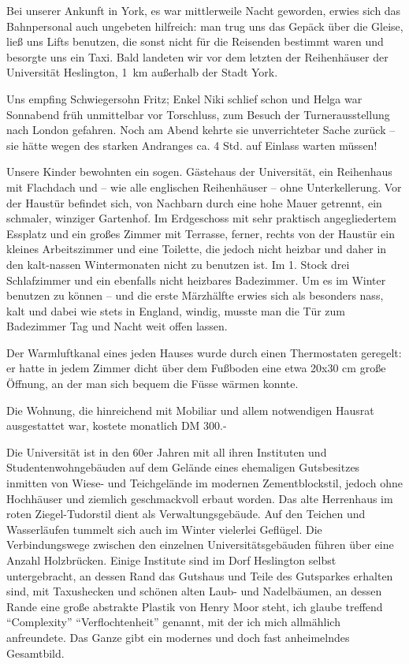 \documentclass[a5paper,pagesize,10pt,twoside=true]{scrbook}
\begin{document}
Bei unserer Ankunft in York, es war mittlerweile Nacht geworden, erwies sich das Bahnpersonal auch ungebeten hilfreich: man trug uns das Gepäck über die Gleise, ließ uns Lifts benutzen, die sonst nicht für die Reisenden bestimmt waren und besorgte uns ein Taxi. Bald landeten wir vor dem letzten der Reihenhäuser der Universität Heslington, 1~km außerhalb der Stadt York.

Uns empfing Schwiegersohn Fritz; Enkel Niki schlief schon und Helga war Sonnabend früh unmittelbar vor Torschluss, zum Besuch der Turnerausstellung nach London gefahren. Noch am Abend kehrte sie unverrichteter Sache zurück -- sie hätte wegen des starken Andranges ca. 4 Std. auf Einlass warten müssen!

Unsere Kinder bewohnten ein sogen. Gästehaus der Universität, ein Reihenhaus mit Flachdach und -- wie alle englischen Reihenhäuser -- ohne Unterkellerung. Vor der Haustür befindet sich, von Nachbarn durch eine hohe Mauer getrennt, ein schmaler, winziger Gartenhof. Im Erdgeschoss mit sehr praktisch angegliedertem Essplatz und ein großes Zimmer mit Terrasse, ferner, rechts von der Haustür ein kleines Arbeitszimmer und eine Toilette, die jedoch nicht heizbar und daher in den kalt-nassen Wintermonaten nicht zu benutzen ist. Im 1. Stock drei Schlafzimmer und ein ebenfalls nicht heizbares Badezimmer. Um es im Winter benutzen zu können -- und die erste Märzhälfte erwies sich als besonders nass, kalt und dabei wie stets in England, windig, musste man die Tür zum Badezimmer Tag und Nacht weit offen lassen.

Der Warmluftkanal eines jeden Hauses wurde durch einen Thermostaten geregelt: er hatte in jedem Zimmer dicht über dem Fußboden eine etwa 20x30 cm große Öffnung, an der man sich bequem die Füsse wärmen konnte.

Die Wohnung, die hinreichend mit Mobiliar und allem notwendigen Hausrat ausgestattet war, kostete monatlich DM 300.-

Die Universität ist in den 60er Jahren mit all ihren Instituten und Studentenwohngebäuden auf dem Gelände eines ehemaligen Gutsbesitzes inmitten von Wiese- und Teichgelände im modernen Zementblockstil, jedoch ohne Hochhäuser und ziemlich geschmackvoll erbaut worden. Das alte Herrenhaus im roten Ziegel-Tudorstil dient als Verwaltungsgebäude. Auf den Teichen und Wasserläufen tummelt sich auch im Winter vielerlei Geflügel. Die Verbindungswege zwischen den einzelnen Universitätsgebäuden führen über eine Anzahl Holzbrücken. Einige Institute sind im Dorf Heslington selbst untergebracht, an dessen Rand das Gutshaus und Teile des Gutsparkes erhalten sind, mit Taxushecken und schönen alten Laub- und Nadelbäumen, an dessen Rande eine große abstrakte Plastik von Henry Moor steht, ich glaube treffend \enquote{Complexity} \enquote{Verflochtenheit} genannt, mit der ich mich allmählich anfreundete. Das Ganze gibt ein modernes und doch fast anheimelndes Gesamtbild.
\end{document}
